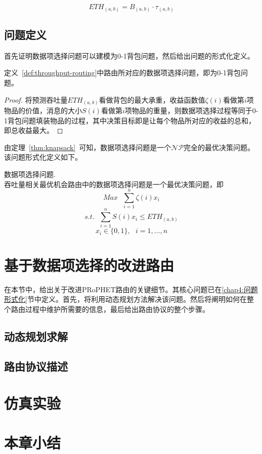 \begin{equation}
ETH_{(a,b)}=B_{(a,b)}\cdot\tau_{(a,b)}
\label{eq:eth}
\end{equation}

\subsection{问题定义}

首先证明数据项选择问题可以建模为0-1背包问题，然后给出问题的形式化定义。

\begin{theorem}
\label{thm:knapsack}
定义~\ref{def:throughput-routing}中路由所对应的数据项选择问题，即为0-1背包问题。
\end{theorem}
\begin{proof}
将预测吞吐量$ETH_{(a,b)}$看做背包的最大承重，收益函数值$\zeta(i)$看做第$i$项物品的价值，消息的大小$S(i)$看做第$i$项物品的重量，则数据项选择过程等同于0-1背包问题填装物品的过程，其中决策目标即是让每个物品所对应的收益的总和，即总收益最大。
\end{proof}

由定理~\ref{thm:knapsack}~可知，数据项选择问题是一个$\mathcal{NP}$完全的最优决策问题。该问题形式化定义如下。

\begin{definition} 数据项选择问题.\\
吞吐量相关最优机会路由中的数据项选择问题是一个最优决策问题，即
\[
Max~~~\sum_{i=1}^{n}\zeta(i)x_i
\]\[
s.t.~~~\sum_{i=1}^{n}S(i)x_i\leq ETH_{(a,b)}
\]\[
x_i\in \{0,1\},~~~i=1,\ldots,n
\]
\end{definition}

\section{基于数据项选择的改进路由}
\label{chap4:基于数据项选择的改进路由}

在本节中，给出关于改进PRoPHET路由的关键细节。其核心问题已在\ref{chap4:问题形式化}节中定义。首先，将利用动态规划方法解决该问题。然后将阐明如何在整个路由过程中维护所需要的信息，最后给出路由协议的整个步骤。

\subsection{动态规划求解}

\subsection{路由协议描述}


\section{仿真实验}
\label{chap4:仿真实验}

\section{本章小结}
\label{chap4:本章小结}
